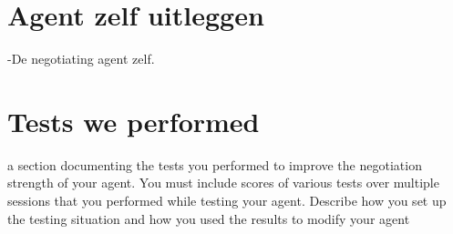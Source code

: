 \documentclass[11pt,a4paper]{report}
\begin{document}
%
%




\newpage

\section*{Agent zelf uitleggen}
-De negotiating agent zelf.




\section*{Tests we performed}

a section documenting the tests you performed to improve the negotiation strength of your agent.
You must include scores of various tests over multiple sessions that you performed while testing
your agent. Describe how you set up the testing situation and how you used the results to modify
your agent
\end{document}

